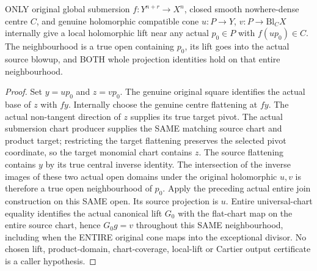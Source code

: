 \begin{theorem}
\label{hir:submersion-blowup-local-cone-original-exceptional}
\leanok
{}
ONLY original global submersion $f:Y^{n+r}\to X^n$, closed smooth nowhere-dense
centre $C$, and genuine holomorphic compatible cone $u:P\to Y$,
$v:P\to\mathrm{Bl}_C X$ internally give a local holomorphic lift near any
actual $p_0\in P$ with $f(u p_0)\in C$. The neighbourhood is a true open
containing $p_0$, its lift goes into the actual source blowup, and BOTH whole
projection identities hold on that entire neighbourhood.
\end{theorem}
\begin{proof}
Set $y=u p_0$ and $z=v p_0$. The genuine original square identifies the actual
base of $z$ with $fy$. Internally choose the genuine centre flattening at $fy$.
The actual non-tangent direction of $z$ supplies its true target pivot. The
actual submersion chart producer supplies the SAME matching source chart and
product target; restricting the target flattening preserves the selected
pivot coordinate, so the target monomial chart contains $z$. The source
flattening contains $y$ by its true central inverse identity. The intersection
of the inverse images of these two actual open domains under the original
holomorphic $u,v$ is therefore a true open neighbourhood of $p_0$.
Apply the preceding actual entire join construction on this SAME open. Its
source projection is $u$. Entire universal-chart equality identifies the
actual canonical lift $G_0$ with the flat-chart map on the entire source
chart, hence $G_0g=v$ throughout this SAME neighbourhood, including when the
ENTIRE original cone maps into the exceptional divisor. No chosen lift,
product-domain, chart-coverage, local-lift or Cartier output certificate is a
caller hypothesis.
\end{proof}

